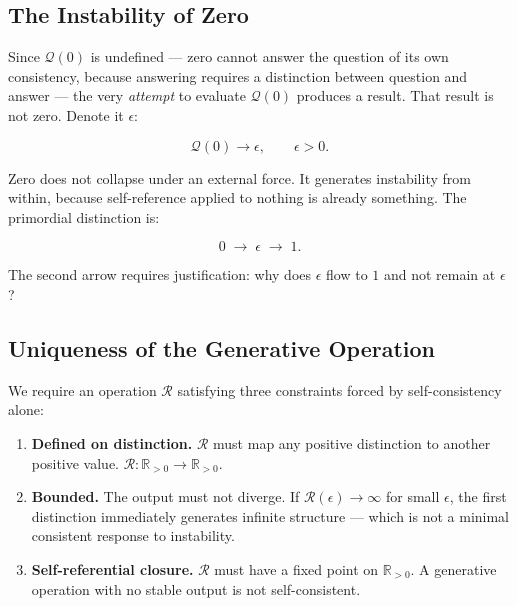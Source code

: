 \documentclass[11pt]{article}
\begin{document}
\subsection{The Instability of Zero}

Since $\mathcal{Q}(0)$ is undefined --- zero cannot answer the
question of its own consistency, because answering requires a
distinction between question and answer --- the very \emph{attempt}
to evaluate $\mathcal{Q}(0)$ produces a result. That result is not
zero. Denote it $\epsilon$:

\begin{equation}
  \mathcal{Q}(0) \to \epsilon, \qquad \epsilon > 0.
\end{equation}

Zero does not collapse under an external force. It generates
instability from within, because self-reference applied to nothing
is already something. The primordial distinction is:

\begin{equation}
  0 \;\longrightarrow\; \epsilon \;\longrightarrow\; 1.
\end{equation}

The second arrow requires justification: why does $\epsilon$
flow to $1$ and not remain at $\epsilon$?

\subsection{Uniqueness of the Generative Operation}

We require an operation $\mathcal{R}$ satisfying three constraints
forced by self-consistency alone:

\begin{enumerate}
  \item \textbf{Defined on distinction.} $\mathcal{R}$ must map
        any positive distinction to another positive value.
        $\mathcal{R}:\mathbb{R}_{>0}\to\mathbb{R}_{>0}$.

  \item \textbf{Bounded.} The output must not diverge.
        If $\mathcal{R}(\epsilon)\to\infty$ for small $\epsilon$,
        the first distinction immediately generates infinite structure
        --- which is not a minimal consistent response to instability.

  \item \textbf{Self-referential closure.} $\mathcal{R}$ must
        have a fixed point on $\mathbb{R}_{>0}$. A generative
        operation with no stable output is not self-consistent.
\end{enumerate}
\end{document}
